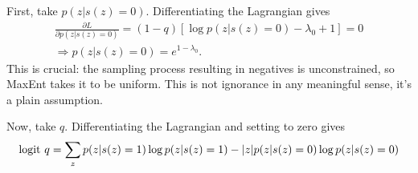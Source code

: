 \bigskip
First, take $p(z|s(z)=0)$. Differentiating the Lagrangian gives
\begin{eqnarray*}
    \frac{\partial L}{\partial p(z|s(z)=0)} = (1-q)\left[\log p(z|s(z)=0)-\lambda_0+1\right]=0\\
    \Rightarrow p(z|s(z)=0)=e^{1-\lambda_0}.
\end{eqnarray*}
This is crucial: the sampling process resulting in negatives is unconstrained, so MaxEnt takes it to be uniform. This is not ignorance in any meaningful sense, it's a plain assumption.

Now, take $q$. Differentiating the Lagrangian and setting to zero gives
\begin{eqnarray*}
    \textup{logit } q = \sum_z p(z|s(z)=1) \log p(z|s(z)=1)-|z| p(z|s(z)=0) \log p(z|s(z)=0)
\end{eqnarray*}